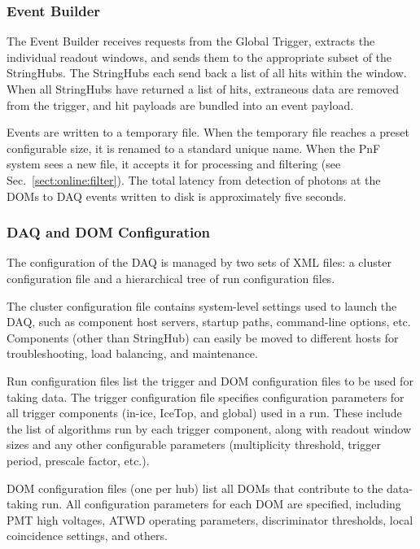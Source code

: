 \subsubsection{\label{sect:online:evbuilder}Event Builder}

The Event Builder receives requests from the Global Trigger, extracts the
individual readout windows, and sends them to the appropriate subset of the
StringHubs.  The StringHubs each send back a list of all hits within the
window.  When all StringHubs have returned a list of hits, extraneous data are
removed from the trigger, and hit payloads are bundled into an event payload.

Events are written to a temporary file.  When the temporary file
reaches a preset configurable size, it is renamed to a standard unique name.  When the PnF
system sees a new file, it accepts it for processing and filtering
(see Sec.~\ref{sect:online:filter}).  The total latency from detection of
photons at the DOMs to DAQ events written to disk is approximately five
seconds. 

\subsubsection{DAQ and DOM Configuration}

The configuration of the DAQ is managed by two sets of XML files: a cluster
configuration file and a hierarchical tree of run configuration files.

The cluster configuration file contains system-level settings used to
launch the DAQ, such as component host servers, startup paths, command-line
options, etc.  Components (other than StringHub) can easily be moved to
different hosts for troubleshooting, load balancing, and maintenance.

Run configuration files list the trigger and DOM configuration files to be
used for taking data.  The trigger configuration file specifies
configuration parameters for all 
trigger components (in-ice, IceTop, and global) used in a run.  These
include the list of algorithms run by each trigger component, along with
readout window sizes and any other configurable parameters (multiplicity
threshold, trigger period, prescale factor, etc.).

DOM configuration files (one per hub) list all DOMs that contribute to
the data-taking run.  All configuration parameters for each DOM are
specified, including PMT high voltages, ATWD operating parameters,
discriminator thresholds, local coincidence settings, and others.

